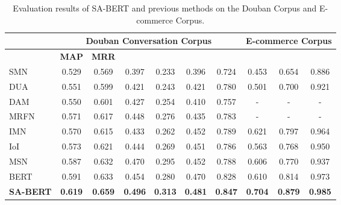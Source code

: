 \documentclass[sigconf]{acmart}
\begin{document}
    \begin{table*}[!hbt]
\caption{Evaluation results of SA-BERT and previous methods on the Douban Corpus and E-commerce Corpus.}
      \centering
      \begin{tabular}{l|c|c|c|c|c|c|c|c|c}
      \toprule
                             & \multicolumn{6}{c|}{Douban Conversation Corpus} & \multicolumn{3}{c}{E-commerce Corpus} \\
      \hline
                             & \textbf{MAP} & \textbf{MRR} &  &  &  &  &  &  &  \\
\hline
       SMN  \cite{DBLP:conf/acl/WuWXZL17}         & 0.529 & 0.569 & 0.397 & 0.233 & 0.396 & 0.724 & 0.453 & 0.654 & 0.886  \\
       DUA  \cite{DBLP:conf/coling/ZhangLZZL18}   & 0.551 & 0.599 & 0.421 & 0.243 & 0.421 & 0.780 & 0.501 & 0.700 & 0.921  \\
       DAM  \cite{DBLP:conf/acl/WuLCZDYZL18}      & 0.550 & 0.601 & 0.427 & 0.254 & 0.410 & 0.757 & -     & -     & -      \\
       MRFN \cite{DBLP:conf/wsdm/TaoWXHZY19}      & 0.571 & 0.617 & 0.448 & 0.276 & 0.435 & 0.783 & -     & -     & -      \\
       IMN  \cite{DBLP:conf/cikm/GuLL19}          & 0.570 & 0.615 & 0.433 & 0.262 & 0.452 & 0.789 & 0.621 & 0.797 & 0.964  \\
       IoI  \cite{DBLP:conf/acl/TaoWXHZY19}       & 0.573 & 0.621 & 0.444 & 0.269 & 0.451 & 0.786 & 0.563 & 0.768 & 0.950  \\
       MSN  \cite{DBLP:conf/emnlp/YuanZLLZHH19}   & 0.587 & 0.632 & 0.470 & 0.295 & 0.452 & 0.788 & 0.606 & 0.770 & 0.937  \\
      \hline
       BERT                                       & 0.591 & 0.633 & 0.454 & 0.280 & 0.470 & 0.828 & 0.610 & 0.814 & 0.973  \\
       \textbf{SA-BERT}                           & \textbf{0.619} & \textbf{0.659} & \textbf{0.496} & \textbf{0.313} & \textbf{0.481} & \textbf{0.847} & \textbf{0.704} & \textbf{0.879} & \textbf{0.985}  \\
      \bottomrule
      \end{tabular}
      \label{tab3}
    \end{table*}
    
\end{document}
